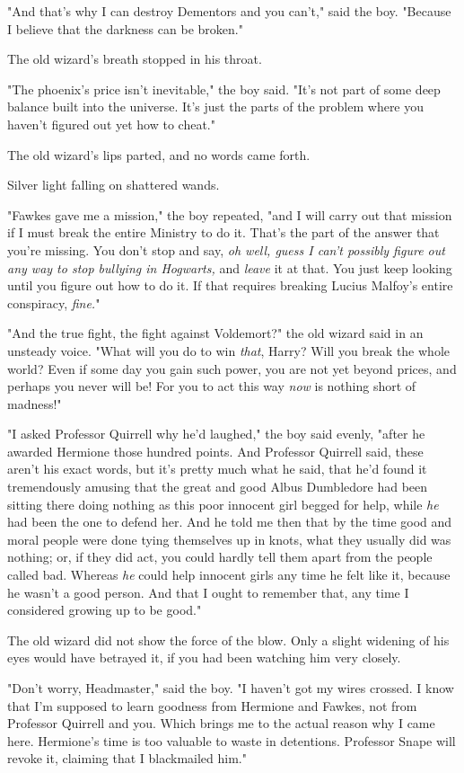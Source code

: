 "And that's why I can destroy Dementors and you can't," said the boy. "Because
I believe that the darkness can be broken."

The old wizard's breath stopped in his throat.

"The phoenix's price isn't inevitable," the boy said. "It's not part of some
deep balance built into the universe. It's just the parts of the problem where
you haven't figured out yet how to cheat."

The old wizard's lips parted, and no words came forth.

Silver light falling on shattered wands.

"Fawkes gave me a mission," the boy repeated, "and I will carry out that
mission if I must break the entire Ministry to do it. That's the part of the
answer that you're missing. You don't stop and say, \emph{oh well, guess I
can't possibly figure out any way to stop bullying in Hogwarts,} and
\emph{leave} it at that. You just keep looking until you figure out how to do
it. If that requires breaking Lucius Malfoy's entire conspiracy, \emph{fine.}"

"And the true fight, the fight against Voldemort?" the old wizard said in an
unsteady voice. "What will you do to win \emph{that}, Harry? Will you break the
whole world? Even if some day you gain such power, you are not yet beyond
prices, and perhaps you never will be! For you to act this way \emph{now} is
nothing short of madness!"

"I asked Professor Quirrell why he'd laughed," the boy said evenly, "after he
awarded Hermione those hundred points. And Professor Quirrell said, these
aren't his exact words, but it's pretty much what he said, that he'd found it
tremendously amusing that the great and good Albus Dumbledore had been sitting
there doing nothing as this poor innocent girl begged for help, while \emph{he}
had been the one to defend her. And he told me then that by the time good and
moral people were done tying themselves up in knots, what they usually did was
nothing; or, if they did act, you could hardly tell them apart from the people
called bad. Whereas \emph{he} could help innocent girls any time he felt like
it, because he wasn't a good person. And that I ought to remember that, any
time I considered growing up to be good."

The old wizard did not show the force of the blow. Only a slight widening of
his eyes would have betrayed it, if you had been watching him very closely.

"Don't worry, Headmaster," said the boy. "I haven't got my wires crossed. I
know that I'm supposed to learn goodness from Hermione and Fawkes, not from
Professor Quirrell and you. Which brings me to the actual reason why I came
here. Hermione's time is too valuable to waste in detentions. Professor Snape
will revoke it, claiming that I blackmailed him."


